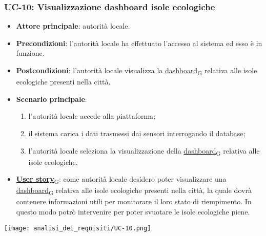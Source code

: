 \subsubsection{UC-10: Visualizzazione dashboard isole ecologiche}
\begin{itemize}
	\item \textbf{Attore principale}: autorità locale.
	\item \textbf{Precondizioni}: l'autorità locale ha effettuato l'accesso al sistema ed esso è in funzione.
	\item \textbf{Postcondizioni}: l'autorità locale visualizza la \href{https://7last.github.io/docs/rtb/documentazione-interna/glossario\#dashboard}{dashboard\textsubscript{G}} relativa
	      alle isole ecologiche presenti nella città.
	\item \textbf{Scenario principale}:
	      \begin{enumerate}
		      \item l'autorità locale accede alla piattaforma;
		      \item il sistema carica i dati trasmessi dai sensori interrogando il database;
		      \item l'autorità locale seleziona la visualizzazione della \href{https://7last.github.io/docs/rtb/documentazione-interna/glossario\#dashboard}{dashboard\textsubscript{G}} relativa alle isole ecologiche.
	      \end{enumerate}
	\item \href{https://7last.github.io/docs/rtb/documentazione-interna/glossario\#user-story}{\textbf{User story}\textsubscript{G}}:
	      come autorità locale desidero poter visualizzare una \href{https://7last.github.io/docs/rtb/documentazione-interna/glossario\#dashboard}{dashboard\textsubscript{G}} relativa alle isole ecologiche presenti nella città, la quale
	      dovrà contenere informazioni utili per monitorare il loro stato di riempimento. In questo modo potrò intervenire
	      per poter svuotare le isole ecologiche piene.
\end{itemize}
\begin{center}
	\texttt{[image: analisi\_dei\_requisiti/UC-10.png]}
\end{center}

\newpage

